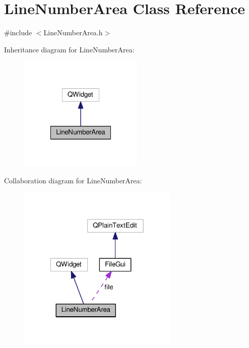 \hypertarget{class_line_number_area}{\section{Line\-Number\-Area Class Reference}
\label{class_line_number_area}
}


{\ttfamily \#include $<$Line\-Number\-Area.\-h$>$}



Inheritance diagram for Line\-Number\-Area\-:\nopagebreak
\begin{figure}[H]
\begin{center}
\leavevmode
\includegraphics[width=168pt]{class_line_number_area__inherit__graph}
\end{center}
\end{figure}


Collaboration diagram for Line\-Number\-Area\-:\nopagebreak
\begin{figure}[H]
\begin{center}
\leavevmode
\includegraphics[width=217pt]{class_line_number_area__coll__graph}
\end{center}
\end{figure}
